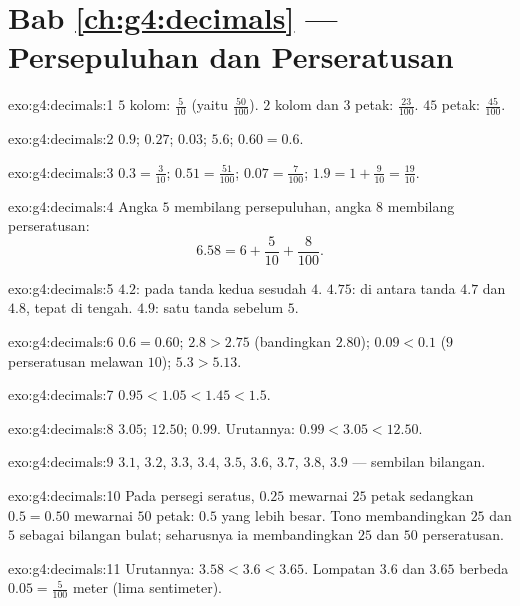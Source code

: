 \section*{Bab \ref{ch:g4:decimals} --- Persepuluhan dan Perseratusan}

\begin{solution}{exo:g4:decimals:1}
$5$ kolom: $\frac{5}{10}$ (yaitu $\frac{50}{100}$). $2$ kolom dan
$3$ petak: $\frac{23}{100}$. $45$ petak: $\frac{45}{100}$.
\end{solution}

\begin{solution}{exo:g4:decimals:2}
$0.9$; \quad $0.27$; \quad $0.03$; \quad $5.6$; \quad
$0.60 = 0.6$.
\end{solution}

\begin{solution}{exo:g4:decimals:3}
$0.3 = \frac{3}{10}$; \quad $0.51 = \frac{51}{100}$; \quad
$0.07 = \frac{7}{100}$; \quad $1.9 = 1 + \frac{9}{10} =
\frac{19}{10}$.
\end{solution}

\begin{solution}{exo:g4:decimals:4}
Angka $5$ membilang persepuluhan, angka $8$ membilang perseratusan:
\[
6.58 = 6 + \frac{5}{10} + \frac{8}{100}.
\]
\end{solution}

\begin{solution}{exo:g4:decimals:5}
$4.2$: pada tanda kedua sesudah $4$. $4.75$: di antara tanda $4.7$
dan $4.8$, tepat di tengah. $4.9$: satu tanda sebelum $5$.
\end{solution}

\begin{solution}{exo:g4:decimals:6}
$0.6 = 0.60$; \quad $2.8 > 2.75$ (bandingkan $2.80$); \quad
$0.09 < 0.1$ ($9$ perseratusan melawan $10$); \quad
$5.3 > 5.13$.
\end{solution}

\begin{solution}{exo:g4:decimals:7}
$0.95 < 1.05 < 1.45 < 1.5$.
\end{solution}

\begin{solution}{exo:g4:decimals:8}
$3.05$; \quad $12.50$; \quad $0.99$. Urutannya:
$0.99 < 3.05 < 12.50$.
\end{solution}

\begin{solution}{exo:g4:decimals:9}
$3.1$, $3.2$, $3.3$, $3.4$, $3.5$, $3.6$, $3.7$, $3.8$, $3.9$ ---
sembilan bilangan.
\end{solution}

\begin{solution}{exo:g4:decimals:10}
Pada persegi seratus, $0.25$ mewarnai $25$ petak sedangkan
$0.5 = 0.50$ mewarnai $50$ petak: $0.5$ yang lebih besar. Tono
membandingkan $25$ dan $5$ sebagai bilangan bulat; seharusnya ia membandingkan $25$ dan $50$ perseratusan.
\end{solution}

\begin{solution}{exo:g4:decimals:11}
Urutannya: $3.58 < 3.6 < 3.65$. Lompatan $3.6$ dan $3.65$ berbeda
$0.05 = \frac{5}{100}$ meter (lima sentimeter).

\end{solution}
